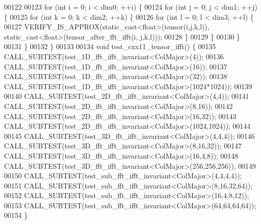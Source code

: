 \begin{DoxyCode}
00122 
00123   \textcolor{keywordflow}{for} (\textcolor{keywordtype}{int} i = 0; i < dim0; ++i) \{
00124     \textcolor{keywordflow}{for} (\textcolor{keywordtype}{int} j = 0; j < dim1; ++j) \{
00125       \textcolor{keywordflow}{for} (\textcolor{keywordtype}{int} k = 0; k < dim2; ++k) \{
00126         \textcolor{keywordflow}{for} (\textcolor{keywordtype}{int} l = 0; l < dim3; ++l) \{
00127           VERIFY\_IS\_APPROX(static\_cast<float>(tensor(i,j,k,l)), static\_cast<float>(tensor\_after\_fft\_ifft(i,
      j,k,l)));
00128         \}
00129       \}
00130     \}
00131   \}
00132 \}
00133 
00134 \textcolor{keywordtype}{void} test\_cxx11\_tensor\_ifft() \{
00135   CALL\_SUBTEST(test\_1D\_fft\_ifft\_invariant<ColMajor>(4));
00136   CALL\_SUBTEST(test\_1D\_fft\_ifft\_invariant<ColMajor>(16));
00137   CALL\_SUBTEST(test\_1D\_fft\_ifft\_invariant<ColMajor>(32));
00138   CALL\_SUBTEST(test\_1D\_fft\_ifft\_invariant<ColMajor>(1024*1024));
00139 
00140   CALL\_SUBTEST(test\_2D\_fft\_ifft\_invariant<ColMajor>(4,4));
00141   CALL\_SUBTEST(test\_2D\_fft\_ifft\_invariant<ColMajor>(8,16));
00142   CALL\_SUBTEST(test\_2D\_fft\_ifft\_invariant<ColMajor>(16,32));
00143   CALL\_SUBTEST(test\_2D\_fft\_ifft\_invariant<ColMajor>(1024,1024));
00144 
00145   CALL\_SUBTEST(test\_3D\_fft\_ifft\_invariant<ColMajor>(4,4,4));
00146   CALL\_SUBTEST(test\_3D\_fft\_ifft\_invariant<ColMajor>(8,16,32));
00147   CALL\_SUBTEST(test\_3D\_fft\_ifft\_invariant<ColMajor>(16,4,8));
00148   CALL\_SUBTEST(test\_3D\_fft\_ifft\_invariant<ColMajor>(256,256,256));
00149 
00150   CALL\_SUBTEST(test\_sub\_fft\_ifft\_invariant<ColMajor>(4,4,4,4));
00151   CALL\_SUBTEST(test\_sub\_fft\_ifft\_invariant<ColMajor>(8,16,32,64));
00152   CALL\_SUBTEST(test\_sub\_fft\_ifft\_invariant<ColMajor>(16,4,8,12));
00153   CALL\_SUBTEST(test\_sub\_fft\_ifft\_invariant<ColMajor>(64,64,64,64));
00154 \}
\end{DoxyCode}
